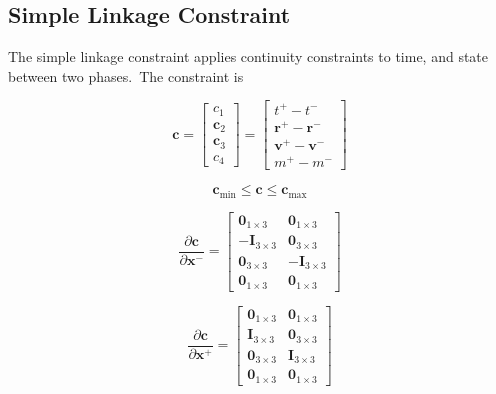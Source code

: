 \subsection{Simple Linkage Constraint}
The simple linkage constraint applies continuity constraints to time, and state between two phases.~The constraint is

\begin{equation}
\boldsymbol{c} = \begin{bmatrix}
c_1\\\boldsymbol{c}_2\\\boldsymbol{c}_3\\c_4
\end{bmatrix} = \begin{bmatrix}
t^+ - t^-\\ \boldsymbol{r}^+ - \boldsymbol{r}^- \\ \boldsymbol{v}^+ - \boldsymbol{v}^- \\ m^+ - m^-
\end{bmatrix}
\end{equation}

\begin{equation}
 \boldsymbol{c}_{\text{min}} \leq \boldsymbol{c} \leq \boldsymbol{c}_{\text{max}}
\end{equation}

\begin{equation}
\frac{\partial  \boldsymbol{c}}{\partial  \boldsymbol{x}^-} = \begin{bmatrix}
 \boldsymbol{0}_{1 \times 3} & \boldsymbol{0}_{1 \times 3} \\
 -\textbf{I}_{3 \times 3}  & \boldsymbol{0}_{3 \times 3} \\
 \boldsymbol{0}_{3 \times 3} & -\textbf{I}_{3 \times 3}\\
 \boldsymbol{0}_{1 \times 3} & \boldsymbol{0}_{1 \times 3}
\end{bmatrix}
\end{equation}

\begin{equation}
\frac{\partial  \boldsymbol{c}}{\partial  \boldsymbol{x}^+} = \begin{bmatrix}
 \boldsymbol{0}_{1 \times 3} & \boldsymbol{0}_{1 \times 3} \\
 \textbf{I}_{3 \times 3}  & \boldsymbol{0}_{3 \times 3} \\
 \boldsymbol{0}_{3 \times 3} & \textbf{I}_{3 \times 3}\\
 \boldsymbol{0}_{1 \times 3} & \boldsymbol{0}_{1 \times 3}
\end{bmatrix}
\end{equation}

